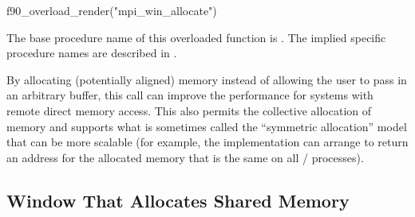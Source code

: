 \begin{mpi-binding}
    f90_overload_render("mpi_win_allocate")
\end{mpi-binding}

 
The base procedure name of this overloaded function is
. The implied specific procedure
names
are described in .

\begin{rationale}
By allocating (potentially aligned) memory instead of allowing the user
to pass in an arbitrary buffer, this call can improve the performance
for systems with remote direct memory access. 
This also permits the collective allocation of memory and
  supports what is sometimes called the ``symmetric allocation'' model
  that can be more scalable (for example, the implementation can
  arrange to return an address for the allocated memory that is the
  same on all \mpi/ processes).
\end{rationale}

\subsection{Window That Allocates Shared Memory}
\label{sec:winallocshared}

